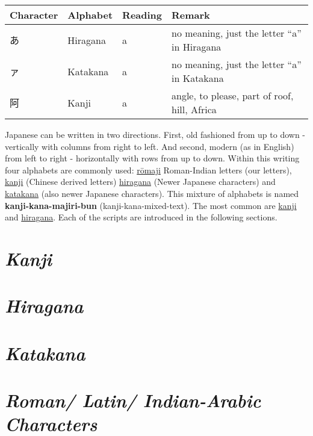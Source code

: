 \begin{center}
\begin{tabular}{|l|l|l|l|}
\textbf{Character}&\textbf{Alphabet}&\textbf{Reading}&\textbf{Remark}\\\hline
あ& Hiragana & a & no meaning, just the letter  ``a'' in Hiragana \\
ァ& Katakana & a & no meaning, just the letter ``a'' in Katakana \\
阿& Kanji    & a & { angle, to please, part of roof, hill, Africa}\\
\end{tabular}
\end{center}

Japanese can be written in two directions. First, old fashioned from up to down
- vertically with columns from right to left. And second, modern (as in
English) from left to right - horizontally with rows from up to down. Within
this writing four alphabets are commonly used:
\hyperref[sec:Romaji]{rōmaji} Roman-Indian letters (our letters),
\hyperref[sec:Kanji]{kanji} (Chinese derived letters)
\hyperref[sec:Hiragana]{hiragana} (Newer Japanese characters) and
\hyperref[sec:Katakana]{katakana}  (also newer Japanese characters).  This
mixture of alphabets is named \textbf{kanji-kana-majiri-bun}
(kanji-kana-mixed-text). The most common are \hyperref[sec:Kanji]{kanji} and
\hyperref[sec:Hiragana]{hiragana}. Each of the scripts are introduced in the
following sections.

\section*{\textit{Kanji}}



\section*{\textit{Hiragana}}



\section*{\textit{Katakana}}



\section*{\textit{Roman/ Latin/ Indian-Arabic Characters}}


